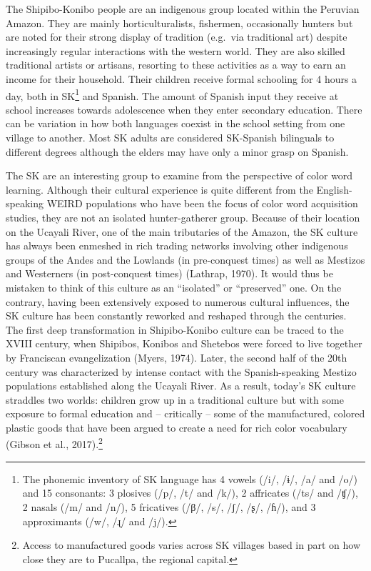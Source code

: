 \documentclass[
  english,
  ,apa7,floatsintext]{apa6}
\begin{document}
The Shipibo-Konibo people are an indigenous group located within the Peruvian Amazon. They are mainly horticulturalists, fishermen, occasionally hunters but are noted for their strong display of tradition (e.g.~via traditional art) despite increasingly regular interactions with the western world. They are also skilled traditional artists or artisans, resorting to these activities as a way to earn an income for their household. Their children receive formal schooling for 4 hours a day, both in SK\footnote{The phonemic inventory of SK language has 4 vowels (/i/, /ɨ/, /a/ and /o/) and 15 consonants: 3 plosives (/p/, /t/ and /k/), 2 affricates (/ts/ and /ʧ/), 2 nasals (/m/ and /n/), 5 fricatives (/β/, /s/, /ʃ/, /ʂ/, /ɦ/), and 3 approximants (/w/, /ɻ/ and /j/).} and Spanish. The amount of Spanish input they receive at school increases towards adolescence when they enter secondary education. There can be variation in how both languages coexist in the school setting from one village to another. Most SK adults are considered SK-Spanish bilinguals to different degrees although the elders may have only a minor grasp on Spanish.

The SK are an interesting group to examine from the perspective of color word learning. Although their cultural experience is quite different from the English-speaking WEIRD populations who have been the focus of color word acquisition studies, they are not an isolated hunter-gatherer group. Because of their location on the Ucayali River, one of the main tributaries of the Amazon, the SK culture has always been enmeshed in rich trading networks involving other indigenous groups of the Andes and the Lowlands (in pre-conquest times) as well as Mestizos and Westerners (in post-conquest times) (Lathrap, 1970). It would thus be mistaken to think of this culture as an ``isolated'' or ``preserved'' one. On the contrary, having been extensively exposed to numerous cultural influences, the SK culture has been constantly reworked and reshaped through the centuries. The first deep transformation in Shipibo-Konibo culture can be traced to the XVIII century, when Shipibos, Konibos and Shetebos were forced to live together by Franciscan evangelization (Myers, 1974). Later, the second half of the 20th century was characterized by intense contact with the Spanish-speaking Mestizo populations established along the Ucayali River. As a result, today's SK culture straddles two worlds: children grow up in a traditional culture but with some exposure to formal education and -- critically -- some of the manufactured, colored plastic goods that have been argued to create a need for rich color vocabulary (Gibson et al., 2017).\footnote{Access to manufactured goods varies across SK villages based in part on how close they are to Pucallpa, the regional capital.}
\end{document}
